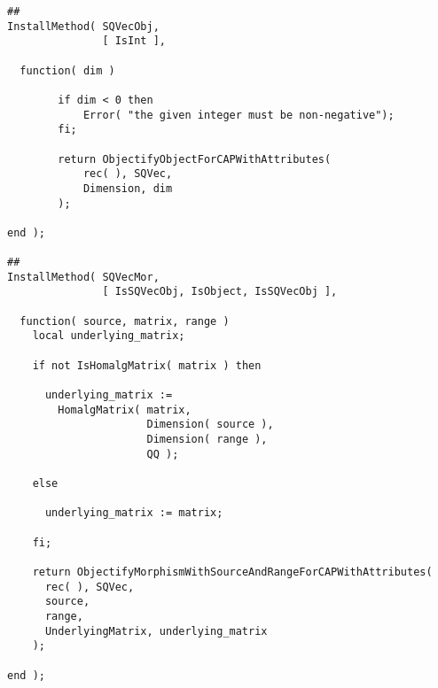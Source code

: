 \begin{small}
\begin{Verbatim}[frame=single]
##
InstallMethod( SQVecObj,
               [ IsInt ],
               
  function( dim )
        
        if dim < 0 then
            Error( "the given integer must be non-negative");
        fi;
        
        return ObjectifyObjectForCAPWithAttributes(
            rec( ), SQVec,
            Dimension, dim
        );
        
end );

##
InstallMethod( SQVecMor,
               [ IsSQVecObj, IsObject, IsSQVecObj ],
                  
  function( source, matrix, range )
    local underlying_matrix;

    if not IsHomalgMatrix( matrix ) then
    
      underlying_matrix := 
        HomalgMatrix( matrix,
                      Dimension( source ),
                      Dimension( range ),
                      QQ );

    else

      underlying_matrix := matrix;

    fi;
    
    return ObjectifyMorphismWithSourceAndRangeForCAPWithAttributes(
      rec( ), SQVec,
      source,
      range,
      UnderlyingMatrix, underlying_matrix
    );
    
end );
\end{Verbatim}
\end{small}